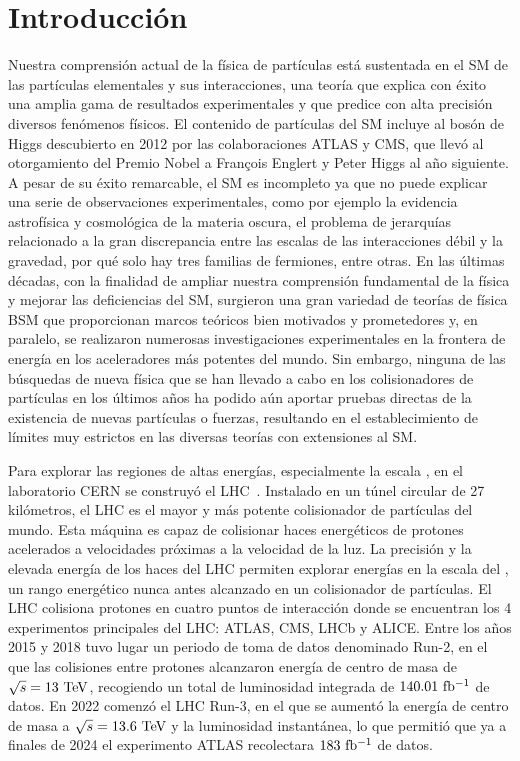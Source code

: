 \chapter*{Introducción}


Nuestra comprensión actual de la física de partículas está sustentada en el \ac{SM} de las partículas elementales y sus interacciones, una teoría que explica con éxito una amplia gama de resultados experimentales y que predice con alta precisión diversos fenómenos físicos. El contenido de partículas del \ac{SM} incluye al bosón de Higgs descubierto en 2012 por las colaboraciones \acs{ATLAS} y \acs{CMS}, que llevó al otorgamiento del Premio Nobel a François Englert y Peter Higgs al año siguiente. A pesar de su éxito remarcable, el \ac{SM} es incompleto ya que no puede explicar una serie de observaciones experimentales, como por ejemplo  la evidencia astrofísica y cosmológica de la materia oscura, el problema de jerarquías relacionado a la gran discrepancia entre las escalas de las interacciones débil y la gravedad, por qué solo hay tres familias de fermiones, entre otras.
En las últimas décadas, con la finalidad de ampliar nuestra comprensión fundamental de la física y mejorar las deficiencias del \ac{SM}, surgieron una gran variedad de teorías de física \ac{BSM} que proporcionan marcos teóricos bien motivados y prometedores y, en paralelo, se realizaron numerosas investigaciones experimentales en la frontera de energía en los aceleradores más potentes del mundo.
Sin embargo, ninguna de las búsquedas de nueva física que se han llevado a cabo en los colisionadores de partículas en los últimos años ha podido aún aportar pruebas directas de la existencia de nuevas partículas o fuerzas, resultando en el establecimiento de límites muy estrictos en las diversas teorías con extensiones al \ac{SM}.

Para explorar las regiones de altas energías, especialmente la escala \TeV, en el laboratorio \ac{CERN} se construyó el \ac{LHC}~\cite{LHC-Machine}. Instalado en un túnel circular de 27 kilómetros, el \ac{LHC} es el mayor y más potente colisionador de partículas del mundo. Esta máquina es capaz de colisionar haces energéticos de protones acelerados a velocidades próximas a la velocidad de la luz. La precisión y la elevada energía de los haces del \ac{LHC} permiten explorar energías en la escala del \TeV, un rango energético nunca antes alcanzado en un colisionador de partículas. El \ac{LHC} colisiona protones en cuatro puntos de interacción donde se encuentran los 4 experimentos principales del \ac{LHC}: \ac{ATLAS}, \ac{CMS}, \ac{LHCb} y \ac{ALICE}. Entre los años 2015 y 2018 tuvo lugar un periodo de toma de datos denominado Run-2, en el que las colisiones entre protones alcanzaron energía de centro de masa de \(\sqs = 13~\TeV\), recogiendo un total de luminosidad integrada de \(140.01~\ifb\) de datos. En 2022 comenzó el \ac{LHC} Run-3, en el que se aumentó la energía de centro de masa a \(\sqs = 13.6~\TeV\) y la luminosidad instantánea, lo que permitió que ya a finales de 2024 el experimento \ac{ATLAS} recolectara \(183~\ifb\) de datos.

